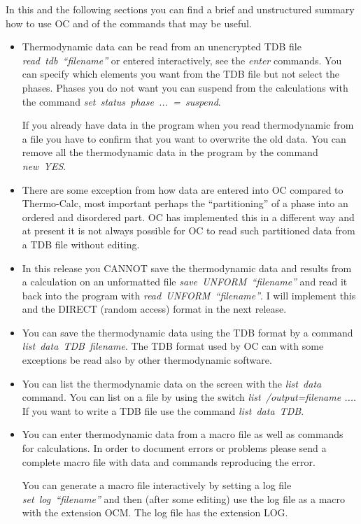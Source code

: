 \documentclass[12pt]{article}
\begin{document}
In this and the following sections you can find a brief and
unstructured summary how to use OC and of the commands that may be
useful.

\begin{itemize}
\item Thermodynamic data can be read from an unencrypted TDB file {\em
  read~tdb~``filename''} or entered interactively, see the {\em enter}
  commands.  You can specify which elements you want from the TDB file
  but not select the phases.  Phases you do not want you can suspend
  from the calculations with the command {\em
    set~status~phase~...~=~suspend}.

  If you already have data in the program when you read thermodynamic
  from a file you have to confirm that you want to overwrite the old
  data.  You can remove all the thermodynamic data in the program by
  the command {\em new~YES}.

\item There are some exception from how data are entered into OC
  compared to Thermo-Calc, most important perhaps the
  ``partitioning'' of a phase into an ordered and disordered part.  OC
  has implemented this in a different way and at present it is not
  always possible for OC to read such partitioned data from a TDB file
  without editing.

\item In this release you CANNOT save the thermodynamic data and
  results from a calculation on an unformatted file {\em
    save~UNFORM~``filename''} and read it back into the program with
  {\em read~UNFORM~``filename''}.  I will implement this and the
  DIRECT (random access) format in the next release.

\item You can save the thermodynamic data using the TDB format by a
  command\\ {\em list~data~TDB~filename}.  The TDB format used by OC
  can with some exceptions be read also by other thermodynamic
  software.

\item You can list the thermodynamic data on the screen with the {\em
  list~data} command.  You can list on a file by using the switch {\em
  list~/output=filename ...}.  If you want to write a TDB file use the
  command {\em list~data~TDB}.
  
\item You can enter thermodynamic data from a macro file as well as
  commands for calculations.  In order to document errors or problems
  please send a complete macro file with data and commands reproducing
  the error.  

  You can generate a macro file interactively by setting a log file
  {\em set~log~``filename''} and then (after some editing) use the log
  file as a macro with the extension OCM.  The log file has the
  extension LOG.

\end{itemize}
\end{document}
